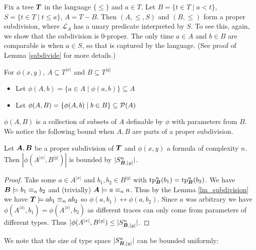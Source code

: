 \documentclass{amsart}
\DeclareMathOperator{\TT}{\boldface T}
\DeclareMathOperator{\A}{\boldface A}
\DeclareMathOperator{\B}{\boldface B}
\renewcommand{\LL}{\mathcal L}
\begin{document}
\begin{Example} \label{ex_cone}
	Fix a tree $\TT$ in the language $\{\leq\}$ and $a \in T$. Let $B = \{t \in T \mid a < t\}$, $S = \{t \in T \mid t \leq a\}$, $A = T - B$. Then $(A, \leq, S)$ and $(B, \leq)$ form a proper subdivision, where $\LL_A$ has a unary predicate interpreted by $S$.
To see this, again, we show that the subdivision is 0-proper.
The only time $a \in A$ and $b \in B$ are comparable is when $a \in S$, so that is captured by the language.
(See proof of Lemma \ref{subdivide} for more details.)
\end{Example}

\begin{Definition} For $\phi(x, y)$, $A \subseteq T^{|x|}$ and $B \subseteq T^{|y|}$
\begin{itemize}
	\item Let $\phi(A, b) = \{a \in A \mid \phi(a, b)\} \subseteq A$
	\item Let $\phi(A, B) = \{\phi(A, b) \mid b \in B\} \subseteq \mathcal P(A)$	
\end{itemize}
\end{Definition}
$\phi(A, B)$ is a collection of subsets of $A$ definable by $\phi$ with parameters from $B$. We notice the following bound when $A, B$ are parts of a proper subdivision.

\begin{Corollary} \label{cor_type_count}
	Let $\A, \B$ be a proper subdivision of $\TT$ and $\phi(x,y)$ a formula of complexity $n$. Then $|\phi(A^{|x|}, B^{|y|})|$ is bounded by $|S^n_{\B, |y|}|$.
\end{Corollary}

\begin{proof}
	Take some $a \in A^{|x|}$ and $b_1, b_2 \in B^{|y|}$ with $\tp^n_{\B}(b_1) = \tp^n_{\B}(b_2)$. We have $\B \models b_1 \equiv_n b_2$ and (trivially) $\A \models a \equiv_n a$. Thus by the Lemma \ref{lm_subdivision} we have $\TT \models ab_1 \equiv_n ab_2$ so $\phi(a, b_1) \leftrightarrow \phi(a, b_2)$. Since $a$ was arbitrary we have $\phi(A^{|x|}, b_1) = \phi(A^{|x|}, b_2)$ as different traces can only come from parameters of different types. Thus $|\phi(A^{|x|}, B^{|y|}) \leq |S^n_{\B, |y|}|$.
\end{proof}

We note that the size of type space $|S^n_{\B, |y|}|$ can be bounded uniformly:
\end{document}
